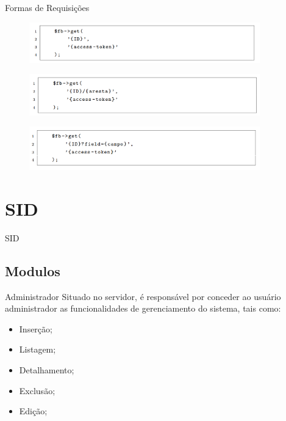 \documentclass{aula-ifb}
\begin{document}
\begin{frame}{Formas de Requisições}
\begin{figure}[h]
\includegraphics[width=10cm]{figuras/requisicaovertice.png}
\label{fig:facebookgraph}
\end{figure}

\begin{figure}[h]
\includegraphics[width=10cm]{figuras/requisicaoaresta.png}
\label{fig:facebookgraph}
\end{figure}

\begin{figure}[h]
\includegraphics[width=10cm]{figuras/requisicaocampo.png}
\label{fig:facebookgraph}
\end{figure}
\end{frame}

\section{SID}
\begin{frame}
SID
\end{frame}
\subsection{Modulos}
\begin{frame}{Administrador}
Situado no servidor, é responsável por conceder ao usuário administrador as funcionalidades de gerenciamento do sistema, tais como:
\begin{itemize}
   \item Inserção;
   \item Listagem;
   \item Detalhamento;
   \item Exclusão;
   \item Edição;
\end{itemize}
\end{frame}
\end{document}
